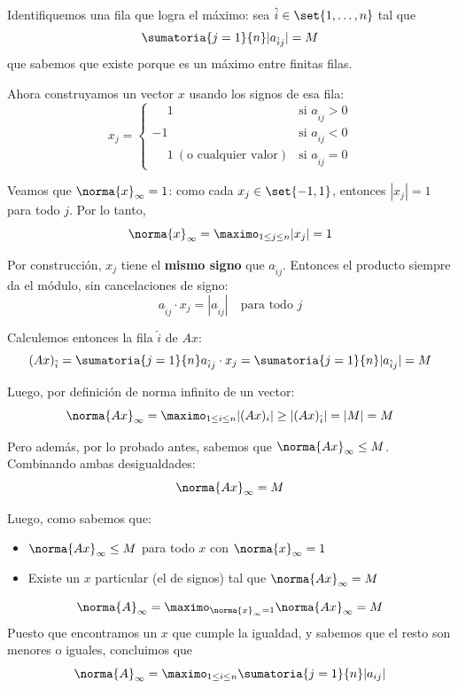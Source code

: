 \begin{enumerate}[label=(\alph*)]
        Identifiquemos una fila que logra el máximo: sea
        $\hat{i} \in \set{1, \dots, n}$ tal que
        $$
          \sumatoria{j=1}{n} |a_{\hat{i}j}| = M
        $$
        que sabemos que existe porque es un máximo entre finitas filas.

        Ahora construyamos un vector $x$ usando los signos de esa fila:
        $$
          x_j =
          \begin{cases}
            \phantom{-}1 & \text{si } a_{\hat{i}j} > 0 \\
            -1 & \text{si } a_{\hat{i}j} < 0 \\
            \phantom{-}1 \ (\text{o cualquier valor}) & \text{si } a_{\hat{i}j} = 0
          \end{cases}
        $$

        Veamos que $\norma{x}_\infty = 1$: como cada $x_j \in \set{-1, 1}$,
        entonces $|x_j| = 1$ para todo $j$. Por lo tanto,
        $$
          \norma{x}_\infty = \maximo_{1 \leq j \leq n} |x_j| = 1
        $$

        Por construcción, $x_j$ tiene el \textbf{mismo signo} que
        $a_{\hat{i}j}$. Entonces el producto siempre da el módulo,
        sin cancelaciones de signo:
        $$
          a_{\hat{i}j} \cdot x_j = |a_{\hat{i}j}| \quad \text{para todo } j
        $$

        Calculemos entonces la fila $\hat{i}$ de $Ax$:
        $$
          (Ax)_{\hat{i}} = \sumatoria{j=1}{n} a_{\hat{i}j} \cdot x_j
          = \sumatoria{j=1}{n} |a_{\hat{i}j}| = M
        $$

        Luego, por definición de norma infinito de un vector:
        $$
          \norma{Ax}_\infty = \maximo_{1 \leq i \leq n} |(Ax)_i|
          \geq |(Ax)_{\hat{i}}| = |M| = M
        $$

        Pero además, por lo probado antes, sabemos que
        $\norma{Ax}_\infty \leq M$. Combinando ambas desigualdades:
        $$
          \norma{Ax}_\infty = M
        $$

        Luego, como sabemos que:
        \begin{itemize}
          \item $\norma{Ax}_\infty \leq M$ para todo $x$ con $\norma{x}_\infty = 1$
          \item Existe un $x$ particular (el de signos) tal que
                $\norma{Ax}_\infty = M$
        \end{itemize}
        $$
          \norma{A}_\infty = \maximo_{\norma{x}_\infty = 1} \norma{Ax}_\infty = M
        $$
        Puesto que encontramos un $x$ que cumple la igualdad, y sabemos
        que el resto son menores o iguales, concluimos que
        $$
          \norma{A}_\infty = \maximo_{1 \leq i \leq n} \sumatoria{j=1}{n} |a_{ij}|
        $$


\end{enumerate}
